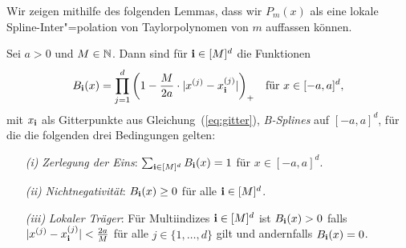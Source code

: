 Wir zeigen mithilfe des folgenden Lemmas, dass wir $P_m(x)$ als eine lokale Spline-Inter"=polation von Taylorpolynomen von $m$ auffassen können.
\begin{lem}
\label{lem:loccon}
Sei $a >0$ und $M \in \mathbb{N}$. Dann sind für $\mathbf{i} \in [M]^d$ die Funktionen 
\begin{equation}
\label{eq:bspline}
B_{\mathbf{i}}(x) = \prod_{j = 1}^{d} \bigg(1 - \frac{M}{2a} \cdot |x^{(j)} - x_{\mathbf{i}}^{(j)}|\bigg)_+ \quad\text{für } x \in [-a, a]^d,
\end{equation}
mit $x_{\mathbf{i}}$ als Gitterpunkte aus Gleichung~(\ref{eq:gitter}), \emph{B-Splines} auf $[-a, a]^d$, für die die folgenden drei Bedingungen gelten:
\begin{itemize}
\item[\emph{(i)}] \emph{Zerlegung der Eins}: $\sum_{\mathbf{i} \in [M]^d} B_{\mathbf{i}}(x) = 1$ für $x \in [-a, a]^d$.
\item[\emph{(ii)}] \emph{Nichtnegativität}: $B_{\mathbf{i}}(x) \geq 0$ für alle $\mathbf{i} \in [M]^d$.
\item[\emph{(iii)}] \emph{Lokaler Träger}: Für Multiindizes $\mathbf{i} \in [M]^d$ ist $B_{\mathbf{i}}(x) > 0$ falls $|x^{(j)} - x_{\mathbf{i}}^{(j)}| < \frac{2a}{M}$ für alle $j \in \{1,\dots,d\}$ gilt und andernfalls $B_{\mathbf{i}}(x) = 0$.
\end{itemize}
\end{lem}
